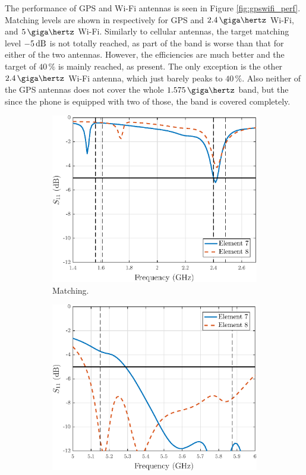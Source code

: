 The performance of GPS and Wi-Fi antennas is seen in Figure \ref{fig:gpswifi_perf}. Matching levels are shown in  respectively for GPS and $2.4\,\giga\hertz$ Wi-Fi, and $5\,\giga\hertz$ Wi-Fi. Similarly to cellular antennas, the target matching level $-5\,\mathrm{dB}$ is not totally reached, as part of the band is worse than that for either of the two antennas. However, the efficiencies are much better and the target of $40\,\%$ is mainly reached, as  present. The only exception is the other $2.4\,\giga\hertz$ Wi-Fi antenna, which just barely peaks to $40\,\%$. Also neither of the GPS antennas does not cover the whole $1.575\,\giga\hertz$ band, but the since the phone is equipped with two of those, the band is covered completely.
\begin{figure}[H]
    \centering
    \begin{subfigure}[b]{0.49\textwidth}
        \includegraphics[width=\textwidth]{img/wifilow_match_wgps.eps}
        \caption{Matching.}
        \label{fig:wifilow_match}
    \end{subfigure}
    \begin{subfigure}[b]{0.49\textwidth}
        \includegraphics[width=\textwidth]{img/wifihi_match_wgps.eps}

\end{subfigure}
\end{figure}
